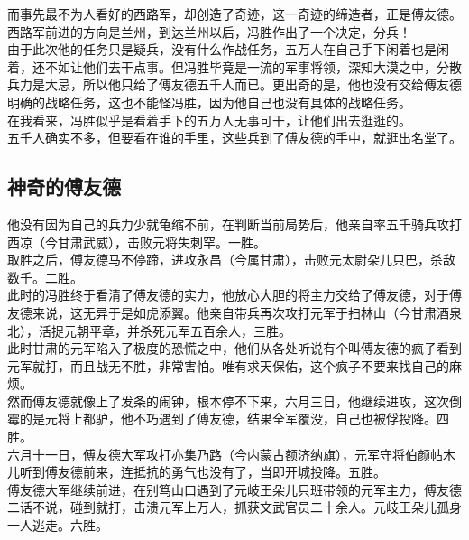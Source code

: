 \begin{multicols}{\theparacolNo}
而事先最不为人看好的西路军，却创造了奇迹，这一奇迹的缔造者，正是傅友德。\\

西路军前进的方向是兰州，到达兰州以后，冯胜作出了一个决定，分兵！\\

由于此次他的任务只是疑兵，没有什么作战任务，五万人在自己手下闲着也是闲着，还不如让他们去干点事。但冯胜毕竟是一流的军事将领，深知大漠之中，分散兵力是大忌，所以他只给了傅友德五千人而已。更出奇的是，他也没有交给傅友德明确的战略任务，这也不能怪冯胜，因为他自己也没有具体的战略任务。\\

在我看来，冯胜似乎是看着手下的五万人无事可干，让他们出去逛逛的。\\

五千人确实不多，但要看在谁的手里，这些兵到了傅友德的手中，就逛出名堂了。\\

\subsection{神奇的傅友德}
他没有因为自己的兵力少就龟缩不前，在判断当前局势后，他亲自率五千骑兵攻打西凉（今甘肃武威），击败元将失刺罕。一胜。\\

取胜之后，傅友德马不停蹄，进攻永昌（今属甘肃），击败元太尉朵儿只巴，杀敌数千。二胜。\\

此时的冯胜终于看清了傅友德的实力，他放心大胆的将主力交给了傅友德，对于傅友德来说，这无异于是如虎添翼。他亲自带兵再次攻打元军于扫林山（今甘肃酒泉北），活捉元朝平章，并杀死元军五百余人，三胜。\\

此时甘肃的元军陷入了极度的恐慌之中，他们从各处听说有个叫傅友德的疯子看到元军就打，而且战无不胜，非常害怕。唯有求天保佑，这个疯子不要来找自己的麻烦。\\

然而傅友德就像上了发条的闹钟，根本停不下来，六月三日，他继续进攻，这次倒霉的是元将上都驴，他不巧遇到了傅友德，结果全军覆没，自己也被俘投降。四胜。\\

六月十一日，傅友德大军攻打亦集乃路（今内蒙古额济纳旗），元军守将伯颜帖木儿听到傅友德前来，连抵抗的勇气也没有了，当即开城投降。五胜。\\

傅友德大军继续前进，在别笃山口遇到了元岐王朵儿只班带领的元军主力，傅友德二话不说，碰到就打，击溃元军上万人，抓获文武官员二十余人。元岐王朵儿孤身一人逃走。六胜。\\


\end{multicols}
